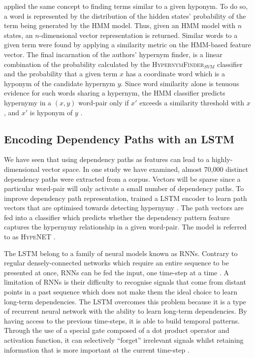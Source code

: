 \citeauthor{ritter2009anyway} applied the same concept to finding terms similar to a given hyponym.  To do so, a word is represented by the distribution of the hidden states’ probability of the term being generated by the \ac{HMM} model.  Thus, given an \ac{HMM} model with $n$ states, an $n$-dimensional vector representation is returned.  Similar words to a given term were found by applying a similarity metric on the \ac{HMM}-based feature vector.  The final incarnation of the authors' hypernym finder, is a linear combination of the probability calculated by the \textsc{HypernymFinder$_{SVM}$} classifier and the probability that a given term $x$ has a coordinate word which is a hyponym of the candidate hypernym $y$. Since word similarity alone is tenuous evidence for such words sharing a hypernym, the \ac{HMM} classifier predicts hypernymy in a $(x, y)$ word-pair only if $x'$ exceeds a similarity threshold with $x$, and $x'$ is hyponym of $y$ \citep{ritter2009anyway}.

\subsection{Encoding Dependency Paths with an LSTM} \label{HypeNet}
We have seen that using dependency paths as features can lead to a highly-dimensional vector space.  In one study we have examined, almost 70,000 distinct dependency paths were extracted from a corpus.  Vectors will be sparse since a particular word-pair will only activate a small number of dependency paths.  To improve dependency path representation, \citeauthor{shwartz2016path} trained a \ac{LSTM} \citep{hochreiter1997long} encoder to learn path vectors that are optimised towards detecting hypernymy \citep{shwartz2016path}.  The path vectors are fed into a classifier which predicts whether the dependency pattern feature captures the hypernymy relationship in a given word-pair.  The model is referred to as \textsc{HypeNET} \citep{shwartz2016path}.

The LSTM belong to a family of neural models known as \ac{RNN}s.  Contrary to regular densely-connected networks which require an entire sequence to be presented at once, \ac{RNN}s can be fed the input, one time-step at a time \citep{chollet2017deep}.  A limitation of \ac{RNN}s is their difficulty to recognise signals that come from distant points in a past sequence which does not make them the ideal choice to learn long-term dependencies.  The \ac{LSTM} overcomes this problem because it is a type of recurrent neural network with the ability to learn long-term dependencies.  By having access to the previous time-steps, it is able to build temporal patterns.  Through the use of a special gate composed of a dot product operator and activation function, it can selectively “forget” irrelevant signals whilst retaining information that is more important at the current time-step \citep{chollet2017deep}.  

